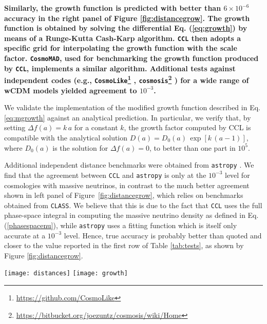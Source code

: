 \documentclass[\docopts]{\docclass}
\newcommand{\ccl}{{\tt CCL}\xspace}
\begin{document}
{\bf Similarly, the growth function is predicted with better than $6\times 10^{-6}$ accuracy in the right panel of Figure \ref{fig:distancegrow}. The growth function is obtained by solving the differential Eq. (\ref{eq:growth}) by means of a Runge-Kutta Cash-Karp algorithm. \ccl then adopts a specific grid for interpolating the growth function with the scale factor. {\tt CosmoMAD}, used for benchmarking the growth function produced by \ccl, implements a similar algorithm. Additional tests against independent codes (e.g., {\tt CosmoLike}\footnote{\url{https://github.com/CosmoLike}} \citealt{krause17}, {\tt cosmosis}\footnote{\url{https://bitbucket.org/joezuntz/cosmosis/wiki/Home}} \citealt{Zuntz15}) for a wide range of wCDM models yielded agreement to $10^{-3}$.}

We validate the implementation of the modified growth function described in Eq. \ref{eq:mgrowth} against an analytical prediction. In particular, we verify that, by setting $\Delta f(a)=k\,a$ for a constant $k$, the growth factor computed by CCL is compatible with the analytical solution $D(a)=D_0(a)\,\exp[k\,(a-1)]$, where $D_0(a)$ is the solution for $\Delta f(a)=0$, to better than one part in $10^{5}$. 

Additional independent distance benchmarks were obtained from {\tt astropy} \citep{astropy}. We find that the agreement between \ccl and {\tt astropy} is only at the $10^{-3}$ level for cosmologies with massive neutrinos, in contrast to the much better agreement shown in left panel of Figure~\ref{fig:distancegrow}, which relies on benchmarks obtained from {\tt CLASS}. We believe that this is due to the fact that \ccl uses the full phase-space integral in computing the massive neutrino density as defined in Eq. (\ref{phasespacenu}), while {\tt astropy} uses a fitting function which is itself only accurate at a $10^{-3}$ level. Hence, true accuracy is probably better than quoted and closer to the value reported in the first row of Table \ref{tab:tests}, as shown by Figure \ref{fig:distancegrow}.





\begin{figure*}
  \centering
  \texttt{[image: distances]}
  \texttt{[image: growth]}
  \caption{Accuracy achieved by \ccl in the prediction of background quantities. Left panel: fractional difference between the predictions of the comoving radial distance by \ccl and the benchmark for models CCL1--5 documented in Table \ref{tab:cosmologies} (solid lines) and models CCL7--11 with massive neutrinos documented in Table \ref{tab:cosmologies_nu} (dashed lines). Right panel: fractional difference between the predictions of the growth factor by \ccl and the benchmark for models CCL1--5. The growth factor in cosmologies with massive neutrinos is scale-dependent and not supported by \ccl.}
  \label{fig:distancegrow}
\end{figure*}
\end{document}
